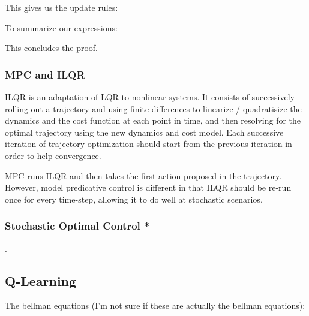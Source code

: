 \documentclass[12pt]{article}
\begin{document}
This gives us the update rules:


To summarize our expressions:


This concludes the proof.

\subsubsection{MPC and ILQR}

ILQR is an adaptation of LQR to nonlinear systems. It consists of successively rolling out a trajectory and using finite differences to linearize / quadratisize the dynamics and the cost function at each point in time, and then resolving for the optimal trajectory using the new dynamics and cost model. Each successive iteration of trajectory optimization should start from the previous iteration in order to help convergence. 

MPC runs ILQR and then takes the first action proposed in the trajectory. However, model predicative control is different in that ILQR should be re-run once for every time-step, allowing it to do well at stochastic scenarios. 

\subsubsection{Stochastic Optimal Control *}
.
\subsection{Q-Learning}

The bellman equations (I'm not sure if these are actually the bellman equations):
\end{document}
